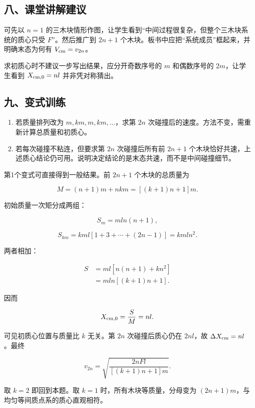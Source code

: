 \documentclass[12pt,a4paper,UTF8]{ctexart}
\newcommand{\tightlist}{\setlength{\itemsep}{0pt}\setlength{\parskip}{0pt}}
\begin{document}
\subsection{八、课堂讲解建议}\label{ux516bux8bfeux5802ux8bb2ux89e3ux5efaux8bae-2}

可先以 \(n=1\)
的三木块情形作图，让学生看到``中间过程很复杂，但整个三木块系统的质心只受
\(F\)''。然后推广到 \(2n+1\)
个木块。板书中应把``系统成员''框起来，并明确末态为何有
\(V_{\rm cm}=v_{2n}\)。

求初质心时不建议一步写出结果，应分开奇数序号的 \(m\) 和偶数序号的
\(2m\)，让学生看到 \(X_{\rm cm,0}=nl\) 并非凭对称猜出。

\subsection{九、变式训练}\label{ux4e5dux53d8ux5f0fux8badux7ec3-2}

\begin{enumerate}
\def\labelenumi{\arabic{enumi}.}
\tightlist
\item
  若质量排列改为 \(m,km,m,km,\ldots\)，求第 \(2n\)
  次碰撞后的速度。方法不变，需重新计算总质量和初质心。
\item
  若每次碰撞不粘连，但要求第 \(2n\) 次碰撞后所有前 \(2n+1\)
  个木块恰好共速，上述质心结论仍可用。说明决定结论的是末态共速，而不是中间碰撞细节。
\end{enumerate}

第1个变式可直接得到一般结果。前 \(2n+1\) 个木块的总质量为

\[M=(n+1)m+nkm=[(k+1)n+1]m.\]

初始质量一次矩分成两组：

\[S_m=mln(n+1),\]

\[S_{km}=kml[1+3+\cdots+(2n-1)]=kmln^2.\]

两者相加：

\[\begin{aligned}
S
&=ml[n(n+1)+kn^2]\\
&=mln[(k+1)n+1].
\end{aligned}\]

因而

\[X_{\rm cm,0}=\frac SM=nl.\]

可见初质心位置与质量比 \(k\) 无关。第 \(2n\) 次碰撞后质心仍在
\(2nl\)，故 \(\Delta X_{\rm cm}=nl\)。最终

\[\boxed{
v_{2n}=\sqrt{
\frac{2nFl}{[(k+1)n+1]m}
}
}.\]

取 \(k=2\) 即回到本题。取 \(k=1\) 时，所有木块等质量，分母变为
\((2n+1)m\)，与均匀等间质点系的质心直观相符。
\end{document}
